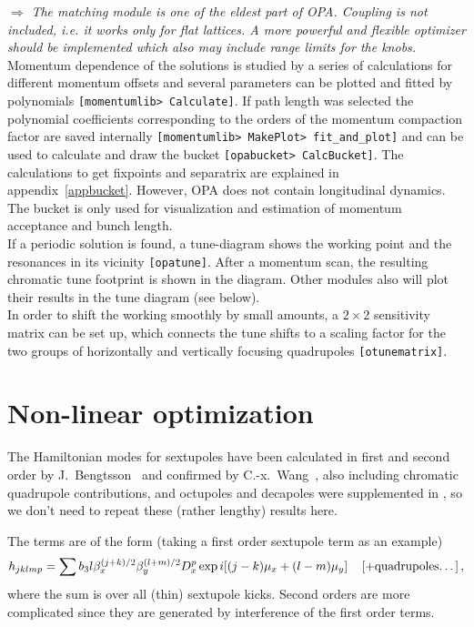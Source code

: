 \documentclass[12pt]{article}
\newcommand\beq{\begin{equation}}
\newcommand\eeq{\end{equation}}
\newcommand\todo[1]{$\Longrightarrow$ {\em #1} }
\newcommand\code[1]{{\tt [#1]}}
\begin{document}
\todo{The matching module is one of the eldest part of OPA. Coupling is not included, i.e. it works only for flat lattices. A more powerful and flexible optimizer should be implemented which also may include range limits for the knobs.} \\

Momentum dependence of the solutions is studied by a series of calculations for different momentum offsets and several parameters can be plotted and fitted by polynomials \code{momentumlib> Calculate}. If path length was selected the polynomial coefficients corresponding to the orders of the momentum compaction factor are saved internally \code{momentumlib> MakePlot> fit\_and\_plot} and can be used to calculate and draw the bucket \code{opabucket> CalcBucket}. The calculations to get fixpoints and separatrix are explained in appendix~\ref{appbucket}. However, OPA does not contain longitudinal dynamics. The bucket is only used for visualization and estimation of momentum acceptance and bunch length.\\

If a periodic solution is found, a tune-diagram shows the working point and the resonances in its vicinity \code{opatune}. After a momentum scan, the resulting chromatic tune footprint is shown in the diagram. Other modules also will plot their results in the tune diagram (see below).\\

In order to shift the working smoothly by small amounts, a $2\times 2$ sensitivity matrix can be set up, which connects the tune shifts to a scaling factor for the two groups of horizontally and vertically focusing quadrupoles \code{otunematrix}.


\section{Non-linear optimization}
The Hamiltonian modes for sextupoles have been calculated in first and second order by J.~Bengtsson~\cite{jbthesis,jbsls} and confirmed by C.-x.~Wang~\cite{WANG}, also including chromatic quadrupole contributions, and octupoles and decapoles were supplemented in \cite{SLAS}, so we don't need to repeat these (rather lengthy) results here.

The terms are of the form (taking a first order sextupole term as an example)
\beq
h_{jklmp} = \sum b_3l \beta_x^{(j+k)/2} \beta_y^{(l+m)/2} D_x^p \exp i [ (j-k)\mu_x + (l-m)\mu_y ] \quad \left[ + \mbox{\rm quadrupoles\dots } \right],
\eeq
where the sum is over all (thin) sextupole kicks. Second orders are more complicated since they are generated by interference of the first order terms.
\end{document}
